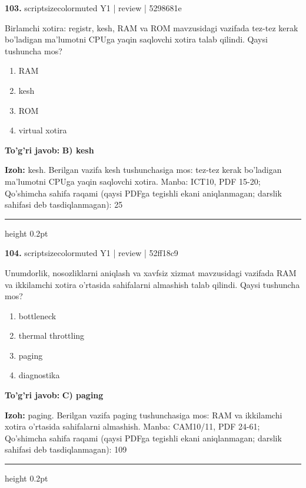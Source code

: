 \documentclass[10pt,a4paper]{article}
\begin{document}
{\bfseries\sffamily\color{ink} 103.} {scriptsizecolor{muted} Y1 | review | 5298681e}
\par
Birlamchi xotira: registr, kesh, RAM va ROM mavzusidagi vazifada tez-tez kerak bo'ladigan ma'lumotni CPUga yaqin saqlovchi xotira talab qilindi. Qaysi tushuncha mos?
\begin{enumerate}[label=\Alph*),leftmargin=9mm]
\item RAM
\item kesh
\item ROM
\item virtual xotira
\end{enumerate}
\begin{tcolorbox}[enhanced,breakable,colback=teal!4,colframe=teal!60!black,boxrule=0.45pt,arc=1.2mm,left=2.7mm,right=2.7mm,top=1.8mm,bottom=1.8mm,before skip=2mm,after skip=2mm]
{\bfseries\sffamily\color{teal}To'g'ri javob:} \textbf{B) kesh}
\par\smallskip
{\bfseries Izoh:} kesh. Berilgan vazifa kesh tushunchasiga mos: tez-tez kerak bo'ladigan ma'lumotni CPUga yaqin saqlovchi xotira. Manba: ICT10, PDF 15-20; Qo'shimcha sahifa raqami (qaysi PDFga tegishli ekani aniqlanmagan; darslik sahifasi deb tasdiqlanmagan): 25
\end{tcolorbox}
\vspace{2mm}\hrule height 0.2pt\vspace{3mm}

{\bfseries\sffamily\color{ink} 104.} {scriptsizecolor{muted} Y1 | review | 52ff18c9}
\par
Unumdorlik, nosozliklarni aniqlash va xavfsiz xizmat mavzusidagi vazifada RAM va ikkilamchi xotira o'rtasida sahifalarni almashish talab qilindi. Qaysi tushuncha mos?
\begin{enumerate}[label=\Alph*),leftmargin=9mm]
\item bottleneck
\item thermal throttling
\item paging
\item diagnostika
\end{enumerate}
\begin{tcolorbox}[enhanced,breakable,colback=teal!4,colframe=teal!60!black,boxrule=0.45pt,arc=1.2mm,left=2.7mm,right=2.7mm,top=1.8mm,bottom=1.8mm,before skip=2mm,after skip=2mm]
{\bfseries\sffamily\color{teal}To'g'ri javob:} \textbf{C) paging}
\par\smallskip
{\bfseries Izoh:} paging. Berilgan vazifa paging tushunchasiga mos: RAM va ikkilamchi xotira o'rtasida sahifalarni almashish. Manba: CAM10/11, PDF 24-61; Qo'shimcha sahifa raqami (qaysi PDFga tegishli ekani aniqlanmagan; darslik sahifasi deb tasdiqlanmagan): 109
\end{tcolorbox}
\vspace{2mm}\hrule height 0.2pt\vspace{3mm}
\end{document}

